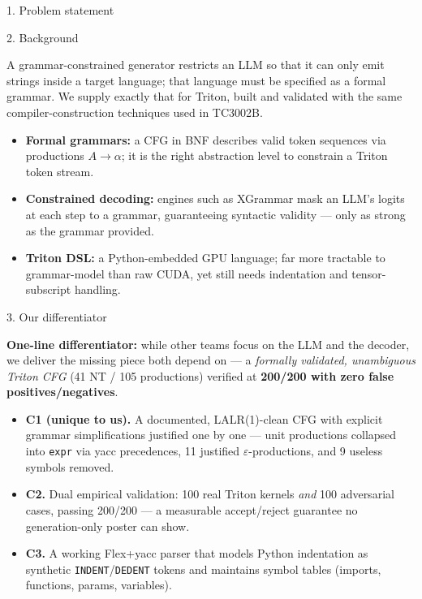 \documentclass[final]{beamer}
\newlength{\colwidth}
\begin{document}
\begin{frame}[t]
\begin{columns}[t]
\begin{column}{\colwidth}
\begin{block}{1. Problem statement}
  \end{block}

  \begin{block}{2. Background}

    A grammar-constrained generator restricts an LLM so that it can only emit
    strings inside a target language; that language must be specified as a
    formal grammar. We supply exactly that for Triton, built and validated
    with the same compiler-construction techniques used in TC3002B.

    \begin{itemize}
      \item \textbf{Formal grammars:} a CFG in BNF describes valid token
        sequences via productions $A \rightarrow \alpha$; it is the right
        abstraction level to constrain a Triton token stream.
      \item \textbf{Constrained decoding:} engines such as XGrammar mask an
        LLM's logits at each step to a grammar, guaranteeing syntactic
        validity — only as strong as the grammar provided.
      \item \textbf{Triton DSL:} a Python-embedded GPU language; far more
        tractable to grammar-model than raw CUDA, yet still needs indentation
        and tensor-subscript handling.
    \end{itemize}

  \end{block}

  \begin{alertblock}{3. Our differentiator}

    \textbf{One-line differentiator:} while other teams focus on the LLM and
    the decoder, we deliver the missing piece both depend on — a
    \emph{formally validated, unambiguous Triton CFG} (41 NT / 105
    productions) verified at \textbf{200/200 with zero false
    positives/negatives}.

    \begin{itemize}
      \item \textbf{C1 (unique to us).} A documented, LALR(1)-clean CFG with
        explicit grammar simplifications justified one by one — unit
        productions collapsed into \texttt{expr} via yacc precedences,
        11 justified $\varepsilon$-productions, and 9 useless symbols removed.
      \item \textbf{C2.} Dual empirical validation: 100 real Triton kernels
        \emph{and} 100 adversarial cases, passing 200/200 — a measurable
        accept/reject guarantee no generation-only poster can show.
      \item \textbf{C3.} A working Flex+yacc parser that models Python
        indentation as synthetic \texttt{INDENT}/\texttt{DEDENT} tokens and
        maintains symbol tables (imports, functions, params, variables).
    \end{itemize}


\end{alertblock}
\end{column}
\end{columns}
\end{frame}
\end{document}
